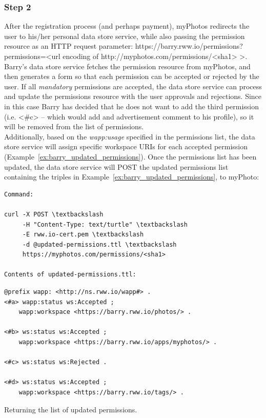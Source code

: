 \subsubsection{Step 2}
After the registration process (and perhaps payment), myPhotos redirects the user to his/her personal data store service, while also passing the permission resource as an HTTP request parameter: https://barry.rww.io/permissions?permissions=<url encoding of http://myphotos.com/permissions/<sha1> >.\\

Barry's data store service fetches the permission resource from myPhotos, and then generates a form so that each permission can be accepted or rejected by the user. If all \textit{mandatory} permissions are accepted, the data store service can process and update the permissions resource with the user approvals and rejections. Since in this case Barry has decided that he does not want to add the third permission (i.e. <\#c> -- which would add and advertisement comment to his profile), so it will be removed from the list of permissions.\\

Additionally, based on the \textit{wapp:usage} specified in the permissions list, the data store service will assign specific workspace URIs for each accepted permission (Example~\ref{ex:barry_updated_permissions}). Once the permissions list has been updated, the data store service will POST the updated permissions list containing the triples in Example~\ref{ex:barry_updated_permissions}, to myPhoto:

\begin{example}[h]
\begin{verbatim}
Command:

curl -X POST \textbackslash
     -H "Content-Type: text/turtle" \textbackslash
     -E rww.io-cert.pem \textbackslash
     -d @updated-permissions.ttl \textbackslash
     https://myphotos.com/permissions/<sha1> 

Contents of updated-permissions.ttl:
\end{verbatim}
\begin{verbatim}
@prefix wapp: <http://ns.rww.io/wapp#> .
<#a> wapp:status ws:Accepted ;
    wapp:workspace <https://barry.rww.io/photos/> .

<#b> ws:status ws:Accepted ;
    wapp:workspace <https://barry.rww.io/apps/myphotos/> .

<#c> ws:status ws:Rejected .

<#d> ws:status ws:Accepted ;
    wapp:workspace <https://barry.rww.io/tags/> .
\end{verbatim}
\caption{Returning the list of updated permissions.}
\label{ex:barry_updated_permissions}
\end{example}

